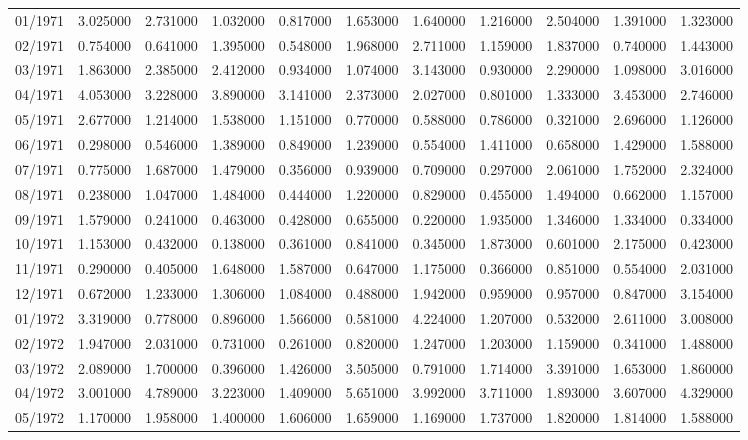 \begin{tabular}{lrrrrrrrrrr}
01/1971 & 3.025000 & 2.731000 & 1.032000 & 0.817000 & 1.653000 & 1.640000 & 1.216000 & 2.504000 & 1.391000 & 1.323000 \\
02/1971 & 0.754000 & 0.641000 & 1.395000 & 0.548000 & 1.968000 & 2.711000 & 1.159000 & 1.837000 & 0.740000 & 1.443000 \\
03/1971 & 1.863000 & 2.385000 & 2.412000 & 0.934000 & 1.074000 & 3.143000 & 0.930000 & 2.290000 & 1.098000 & 3.016000 \\
04/1971 & 4.053000 & 3.228000 & 3.890000 & 3.141000 & 2.373000 & 2.027000 & 0.801000 & 1.333000 & 3.453000 & 2.746000 \\
05/1971 & 2.677000 & 1.214000 & 1.538000 & 1.151000 & 0.770000 & 0.588000 & 0.786000 & 0.321000 & 2.696000 & 1.126000 \\
06/1971 & 0.298000 & 0.546000 & 1.389000 & 0.849000 & 1.239000 & 0.554000 & 1.411000 & 0.658000 & 1.429000 & 1.588000 \\
07/1971 & 0.775000 & 1.687000 & 1.479000 & 0.356000 & 0.939000 & 0.709000 & 0.297000 & 2.061000 & 1.752000 & 2.324000 \\
08/1971 & 0.238000 & 1.047000 & 1.484000 & 0.444000 & 1.220000 & 0.829000 & 0.455000 & 1.494000 & 0.662000 & 1.157000 \\
09/1971 & 1.579000 & 0.241000 & 0.463000 & 0.428000 & 0.655000 & 0.220000 & 1.935000 & 1.346000 & 1.334000 & 0.334000 \\
10/1971 & 1.153000 & 0.432000 & 0.138000 & 0.361000 & 0.841000 & 0.345000 & 1.873000 & 0.601000 & 2.175000 & 0.423000 \\
11/1971 & 0.290000 & 0.405000 & 1.648000 & 1.587000 & 0.647000 & 1.175000 & 0.366000 & 0.851000 & 0.554000 & 2.031000 \\
12/1971 & 0.672000 & 1.233000 & 1.306000 & 1.084000 & 0.488000 & 1.942000 & 0.959000 & 0.957000 & 0.847000 & 3.154000 \\
01/1972 & 3.319000 & 0.778000 & 0.896000 & 1.566000 & 0.581000 & 4.224000 & 1.207000 & 0.532000 & 2.611000 & 3.008000 \\
02/1972 & 1.947000 & 2.031000 & 0.731000 & 0.261000 & 0.820000 & 1.247000 & 1.203000 & 1.159000 & 0.341000 & 1.488000 \\
03/1972 & 2.089000 & 1.700000 & 0.396000 & 1.426000 & 3.505000 & 0.791000 & 1.714000 & 3.391000 & 1.653000 & 1.860000 \\
04/1972 & 3.001000 & 4.789000 & 3.223000 & 1.409000 & 5.651000 & 3.992000 & 3.711000 & 1.893000 & 3.607000 & 4.329000 \\
05/1972 & 1.170000 & 1.958000 & 1.400000 & 1.606000 & 1.659000 & 1.169000 & 1.737000 & 1.820000 & 1.814000 & 1.588000 \\

\end{tabular}

